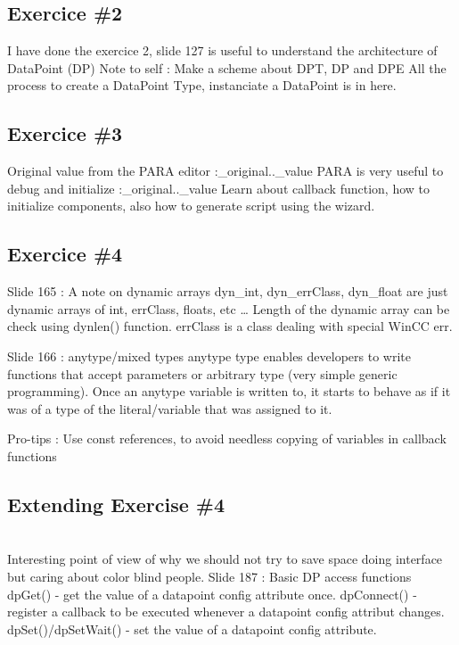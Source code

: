 \documentclass[a4paper, 10pt]{article}
\begin{document}
\subsection{Exercice \#2}
I have done the exercice 2, slide 127 is useful to understand the architecture of DataPoint (DP)
Note to self : Make a scheme about DPT, DP and DPE
All the process to create a DataPoint Type, instanciate a DataPoint is in here.

\subsection{Exercice \#3}
Original value from the PARA editor :\_original..\_value
PARA is very useful to debug and initialize :\_original..\_value
Learn about callback function, how to initialize components, also how to generate script using the wizard.

\subsection{Exercice \#4}

Slide 165 : A note on dynamic arrays
dyn\_int, dyn\_errClass, dyn\_float are just dynamic arrays of int, errClass, floats, etc \dots 
Length of the dynamic array can be check using dynlen() function.
errClass is a class dealing with special WinCC err.

Slide 166 : anytype/mixed types
anytype type enables developers to write functions that accept parameters or arbitrary type (very simple generic programming). Once an anytype variable is written to, it starts to behave as if it was of a type of the literal/variable that was assigned to it.

Pro-tips : Use const references, to avoid needless copying of variables in callback functions

\subsection{Extending Exercise \#4}\\

Interesting point of view of why we should not try to save space doing interface but caring about color blind people.
Slide 187 : Basic DP access functions
dpGet() - get the value of a datapoint config attribute once.
dpConnect() - register a callback to be executed whenever a datapoint config attribut changes.
dpSet()/dpSetWait() - set the value of a datapoint config attribute.\\
\end{document}
